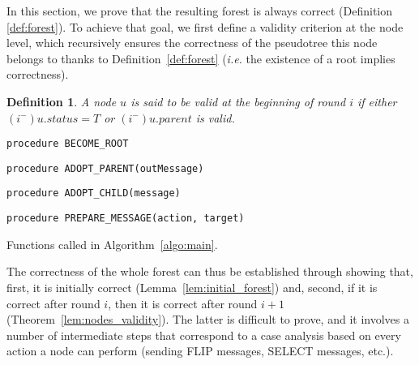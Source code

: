 \documentclass[twocolumn]{article}
\newtheorem{definition}{Definition}
\newcommand{\state}[3]{\ensuremath{(#2^{#3})#1}}
\newcommand{\uim}{\state{u}{i}{-}}
\begin{document}
In this section, we prove that the resulting forest is always correct (Definition \ref{def:forest}). 
To achieve that goal, 
we first define a validity criterion at the node level, which recursively ensures the correctness of the pseudotree this node belongs to thanks to Definition~\ref{def:forest} ({\it i.e.} the existence of a root implies correctness).



\begin{definition}
A node $u$ is said to be valid at the beginning of round $i$ if either $\uim.status=T$ or $\uim.parent$ is valid. 
\end{definition}


\begin{algorithm2e}[h]









        \texttt{procedure BECOME\_ROOT}
  \bigskip

  \texttt{procedure ADOPT\_PARENT(outMessage)}
  \bigskip

  \texttt{procedure ADOPT\_CHILD(message)}
  \bigskip

  \texttt{procedure PREPARE\_MESSAGE(action, target)}
  \caption{Functions called in Algorithm~\ref{algo:main}.}
  \label{algo:functions}
\end{algorithm2e}

The correctness of the whole forest can thus be established through showing that, first, it is initially correct (Lemma~\ref{lem:initial_forest}) and, second, if it is correct after round $i$, then it is correct after round $i+1$ (Theorem~\ref{lem:nodes_validity}). The latter is difficult to prove, and it involves a number of intermediate steps that correspond to a case analysis based on every action a node can perform (sending FLIP messages, SELECT messages, etc.).
\end{document}

